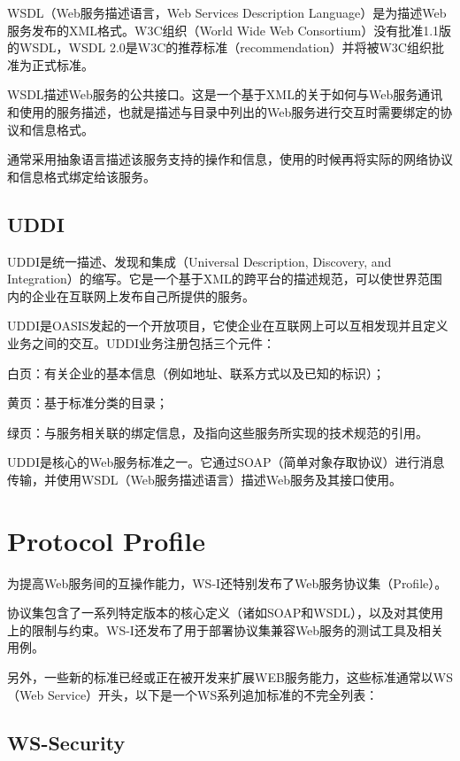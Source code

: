 WSDL（Web服务描述语言，Web Services Description Language）是为描述Web服务发布的XML格式。W3C组织（World Wide Web Consortium）没有批准1.1版的WSDL，WSDL 2.0是W3C的推荐标准（recommendation）并将被W3C组织批准为正式标准。

WSDL描述Web服务的公共接口。这是一个基于XML的关于如何与Web服务通讯和使用的服务描述，也就是描述与目录中列出的Web服务进行交互时需要绑定的协议和信息格式。

通常采用抽象语言描述该服务支持的操作和信息，使用的时候再将实际的网络协议和信息格式绑定给该服务。

\section{UDDI}

UDDI是统一描述、发现和集成（Universal Description, Discovery, and Integration）的缩写。它是一个基于XML的跨平台的描述规范，可以使世界范围内的企业在互联网上发布自己所提供的服务。

UDDI是OASIS发起的一个开放项目，它使企业在互联网上可以互相发现并且定义业务之间的交互。UDDI业务注册包括三个元件：

\begin{compactitem}
\item 白页：有关企业的基本信息（例如地址、联系方式以及已知的标识）；
\item 黄页：基于标准分类的目录；
\item 绿页：与服务相关联的绑定信息，及指向这些服务所实现的技术规范的引用。
\end{compactitem}

UDDI是核心的Web服务标准之一。它通过SOAP（简单对象存取协议）进行消息传输，并使用WSDL（Web服务描述语言）描述Web服务及其接口使用。




\chapter{Protocol Profile}


为提高Web服务间的互操作能力，WS-I还特别发布了Web服务协议集（Profile）。

协议集包含了一系列特定版本的核心定义（诸如SOAP和WSDL），以及对其使用上的限制与约束。WS-I还发布了用于部署协议集兼容Web服务的测试工具及相关用例。

另外，一些新的标准已经或正在被开发来扩展WEB服务能力，这些标准通常以WS（Web Service）开头，以下是一个WS系列追加标准的不完全列表：

\section{WS-Security}

